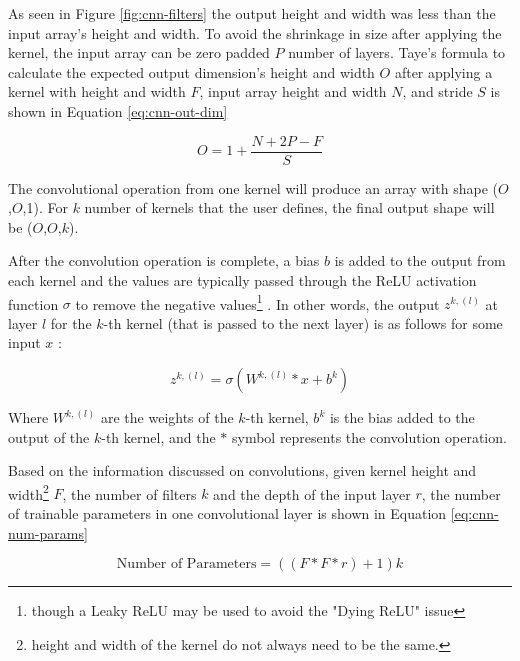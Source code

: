As seen in Figure \ref{fig:cnn-filters} the output height and width was less than the input array's height and width. To avoid the shrinkage in size after applying the kernel, the input array can be zero padded $P$ number of layers. Taye's \cite{tayeTheoreticalUnderstandingConvolutional2023} formula to calculate the expected output dimension's height and width $O$ after applying a kernel with height and width $F$, input array height and width $N$, and stride $S$ is shown in Equation \ref{eq:cnn-out-dim}

\begin{equation}
    \label{eq:cnn-out-dim}
    O = 1 + \frac{N + 2P - F}{S}
\end{equation}

The convolutional operation from one kernel will produce an array with shape ($O$,$O$,1). For $k$ number of kernels that the user defines, the final output shape will be ($O$,$O$,$k$).

After the convolution operation is complete, a bias $b$ is added to the output from each kernel and the values are typically passed through the ReLU activation function $\sigma$ to remove the negative values\footnote{though a Leaky ReLU may be used to avoid the "Dying ReLU" issue} \cite{tayeTheoreticalUnderstandingConvolutional2023,purwonoUnderstandingConvolutionalNeural2023}. In other words, the output $z^{k, (l)}$ at layer $l$ for the $k$-th kernel (that is passed to the next layer) is as follows for some input $x$ \cite{alzubaidiReviewDeepLearning2021}:

\begin{equation}
   \label{eq:cnn-output}
    z^{k, (l)} = \sigma(W^{k, (l)} * x + b^k)
\end{equation}


Where $W^{k, (l)}$ are the weights of the $k$-th kernel, $b^k$ is the bias added to the output of the $k$-th kernel, and the $*$ symbol represents the convolution operation.

Based on the information discussed on convolutions, given kernel height and width\footnote{height and width of the kernel do not always need to be the same.} $F$, the number of filters $k$ and the depth of the input layer $r$, the number of trainable parameters in one convolutional layer is shown in Equation \ref{eq:cnn-num-params}

\begin{equation}
    \label{eq:cnn-num-params}
    \text{Number of Parameters} = ((F * F * r) + 1)k
\end{equation}

